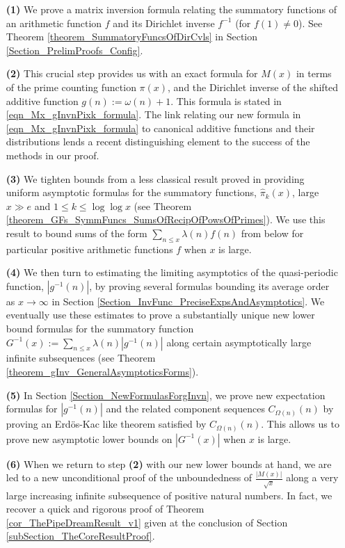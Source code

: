 \documentclass[11pt,reqno,a4letter]{article}
\numberwithin{figure}{section}
\numberwithin{table}{section}
\theoremstyle{plain}
\numberwithin{theorem}{section}
\theoremstyle{definition}
\begin{document}
\begin{itemize} 

\item[\textbf{(1)}] We prove a matrix inversion formula relating the summatory 
           functions of an arithmetic function $f$ and its Dirichlet inverse $f^{-1}$ (for $f(1) \neq 0$). 
           See Theorem \ref{theorem_SummatoryFuncsOfDirCvls} in 
           Section \ref{Section_PrelimProofs_Config}.  
\item[\textbf{(2)}] This crucial step provides us with an exact formula for $M(x)$ in terms of 
           the prime counting function $\pi(x)$, and the 
           Dirichlet inverse of the shifted additive function $g(n) := \omega(n) + 1$. This 
           formula is stated in \eqref{eqn_Mx_gInvnPixk_formula}. 
           The link relating our new formula in 
           \eqref{eqn_Mx_gInvnPixk_formula} to canonical additive functions and their 
           distributions lends a recent distinguishing element to the 
           success of the methods in our proof. 
\item[\textbf{(3)}] We tighten bounds from a less classical result proved in 
            \cite[\S 7]{MV} providing uniform asymptotic formulas for the  
           summatory functions, $\widehat{\pi}_k(x)$, large $x \gg e$ and 
           $1 \leq k \leq \log\log x$ 
           (see Theorem \ref{theorem_GFs_SymmFuncs_SumsOfRecipOfPowsOfPrimes}). 
           We use this result to bound sums of the form 
           $\sum_{n \leq x} \lambda(n) f(n)$ from below for particular positive arithmetic 
           functions $f$ when $x$ is large. 
\item[\textbf{(4)}] We then turn to estimating the limiting 
           asymptotics of the quasi-periodic function, $|g^{-1}(n)|$, by proving several formulas bounding its 
           average order as $x \rightarrow \infty$ in 
           Section \ref{Section_InvFunc_PreciseExpsAndAsymptotics}. 
           We eventually use these estimates to prove a substantially unique new lower bound formulas 
           for the summatory function 
           $G^{-1}(x) := \sum_{n \leq x} \lambda(n) |g^{-1}(n)|$ 
           along certain asymptotically large 
           infinite subsequences (see Theorem \ref{theorem_gInv_GeneralAsymptoticsForms}). 
\item[\textbf{(5)}] In Section \ref{Section_NewFormulasForgInvn}, 
           we prove new expectation formulas for $|g^{-1}(n)|$ and the related component sequences 
           $C_{\Omega(n)}(n)$ by proving an Erd\"os-Kac like theorem satisfied by $C_{\Omega(n)}(n)$. 
           This allows us to prove new asymptotic lower bounds on $|G^{-1}(x)|$ when $x$ is large. 
\item[\textbf{(6)}] When we return to step \textbf{(2)} 
           with our new lower bounds at hand, we are led to a new unconditional proof of the 
           unboundedness of $\frac{|M(x)|}{\sqrt{x}}$ 
           along a very large increasing infinite subsequence of positive natural numbers. 
           In fact, we recover a quick and rigorous proof of 
           Theorem \ref{cor_ThePipeDreamResult_v1} given at the conclusion of 
           Section \ref{subSection_TheCoreResultProof}. 
           

\end{itemize}
\end{document}
